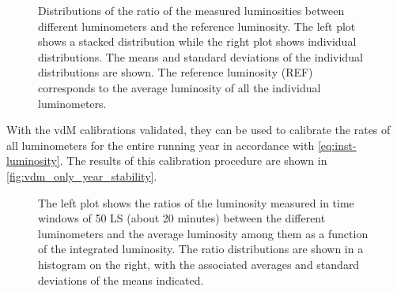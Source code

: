 \begin{figure}[!htb]
	\centering
	\caption[vdM luminosity ratio distributions]{Distributions of the ratio of the measured luminosities between different luminometers and the reference luminosity. The left plot shows a stacked distribution while the right plot shows individual distributions. The means and standard deviations of the individual distributions are shown. The reference luminosity (REF) corresponds to the average luminosity of all the individual luminometers.}
	\label{fig:vdm_ratio_histograms}
\end{figure}

With the vdM calibrations validated, they can be used to calibrate the rates of all luminometers for the entire running year in accordance with \autoref{eq:inst-luminosity}. The results of this calibration procedure are shown in \autoref{fig:vdm_only_year_stability}.

\begin{figure}[!htb]
	\centering
	\caption[Full year luminosity ratios with only vdM calibration]{The left plot shows the ratios of the luminosity measured in time windows of 50 LS (about 20 minutes) between the different luminometers and the average luminosity among them as a function of the integrated luminosity. The ratio distributions are shown in a histogram on the right, with the associated averages and standard deviations of the means indicated.}
	\label{fig:vdm_only_year_stability}
\end{figure}


